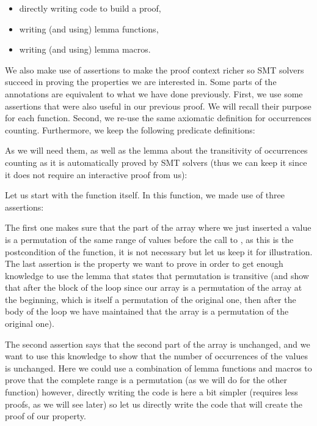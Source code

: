 \begin{itemize}
\item directly writing code to build a proof,
\item writing (and using) lemma functions,
\item writing (and using) lemma macros.
\end{itemize}


We also make use of assertions to make the proof context richer so SMT solvers
succeed in proving the properties we are interested in. Some parts of the
annotations are equivalent to what we have done previously. First, we use some
assertions that were also useful in our previous proof. We will recall their
purpose for each function. Second, we re-use the same axiomatic definition for
occurrences counting. Furthermore, we keep the following predicate definitions:




As we will need them, as well as the lemma about the transitivity of
occurrences counting as it is automatically proved by SMT solvers (thus we can
keep it since it does not require an interactive proof from us):




Let us start with the  function itself. In this
function, we made use of three assertions:




The first one makes sure that the part of the array where we just inserted a
value is a permutation of the same range of values before the call to
, as this is the postcondition of the function, it is not
necessary but let us keep it for illustration. The last assertion is the
property we want to prove in order to get enough knowledge to use the lemma that
states that permutation is transitive (and show that after the block of the loop
since our array is a permutation of the array at the beginning, which is itself
a permutation of the original one, then after the body of the loop we have
maintained that the array is a permutation of the original one).



The second assertion says that the second part of the array is unchanged, and we
want to use this knowledge to show that the number of occurrences of the values
is unchanged. Here we could use a combination of lemma functions and macros to
prove that the complete range is a permutation (as we will do for the other
function) however, directly writing the code is here a bit simpler (requires
less proofs, as we will see later) so let us directly write the code that will
create the proof of our property.



